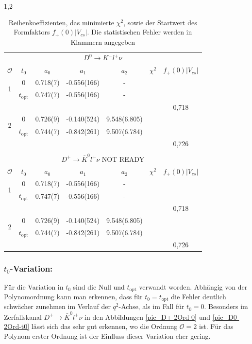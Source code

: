\documentclass[11pt,a4paper,twoside,draft]{report}
\begin{document}
\begin{spacing}{1,2}
 \renewcommand{\arraystretch}{1.2}
\begin{table}[h]
 \begin{tabular}{cc|ccccc}
 \toprule
  \multicolumn{7}{c}{$D^0 \rightarrow  K^- l^+ \nu$} \\
   $\mathcal{O}$ & $t_0$ & $a_0$ & $a_1$ & $a_2$ & $\chi^2$ & $f_+(0)|V_{cs}|$\\
   \midrule
   \multirow{2}{*}{1} & 0 & 0.718(7) & -0.556(166) & - &\\
   & $t_\text{opt}$ & 0.747(7) & -0.556(166) & -\\
   & & & &  & &0,718 \\
   \hline
      \multirow{2}{*}{2} & 0 & 0.726(9) & -0.140(524) & 9.548(6.805)\\
   & $t_\text{opt}$ & 0.744(7) & -0.842(261) & 9.507(6.784)\\
     & & & & & &0,726 \\
     \multicolumn{7}{c}{}\\
     \midrule\midrule
   \multicolumn{7}{c}{$D^+ \rightarrow  \bar K^0 l^+ \nu$ NOT READY} \\
   $\mathcal{O}$ & $t_0$ & $a_0$ & $a_1$ & $a_2$ & $\chi^2$ &$f_+(0)|V_{cs}|$\\
   \midrule
   \multirow{2}{*}{1} & 0 & 0.718(7) & -0.556(166) & - &\\
   & $t_\text{opt}$ & 0.747(7) & -0.556(166) & -\\
   & & & & && 0,718 \\
   \hline
      \multirow{2}{*}{2} & 0 & 0.726(9) & -0.140(524) & 9.548(6.805)\\
   & $t_\text{opt}$ & 0.744(7) & -0.842(261) & 9.507(6.784)\\
     & & & & & &0,726 \\
     \bottomrule\bottomrule
 \end{tabular}
\caption{Reihenkoeffizienten, das minimierte $\chi^2$, sowie der Startwert des Formfaktors $f_+(0)|V_{cs}|$. Die statistischen Fehler werden in Klammern
angegeben}
\label{tab_ResChiF0Ai}
\end{table}
 \renewcommand{\arraystretch}{1.0}

\noindent
\subsubsection*{$t_0$-Variation:}
Für die Variation in $t_0$ sind die Null und $t_\text{opt}$ verwandt worden. Abhängig von der Polynomordnung kann man erkennen, dass für 
$t_0 = t_\text{opt}$ die Fehler deutlich schwächer zunehmen im Verlauf der $q^2$-Achse, als im Fall für $t_0 = 0$. Besonders im Zerfallskanal $D^+ \rightarrow \bar K^0 l^+ \nu$
in den Abbildungen \ref{pic_D+-2Ord-0} und \ref{pic_D0-2Ord-t0} lässt sich das sehr gut erkennen, wo die Ordnung $\mathcal{O} = 2$ ist. Für das Polynom
erster Ordnung ist der Einfluss dieser Variation eher gering. 


\end{spacing}
\end{document}
